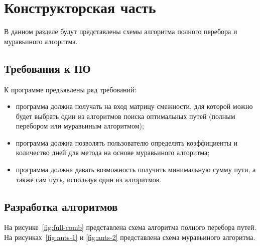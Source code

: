 \chapter{Конструкторская часть}

В данном разделе будут представлены схемы алгоритма полного перебора и муравьиного алгоритма.

\section{Требования к ПО}

К программе предъявлены ряд требований:

\begin{itemize}[label=---]
	\item программа должна получать на вход матрицу смежности, для которой можно будет выбрать один из алгоритмов поиска оптимальных путей (полным перебором или муравьиным алгоритмом);
	\item программа должна позволять пользователю определять коэффициенты и количество дней для метода на основе муравьиного алгоритма;
	\item программа должна давать возможность получить минимальную сумму пути, а также сам путь, используя один из алгоритмов.
\end{itemize}

\section{Разработка алгоритмов}

На рисунке~\ref{fig:full-comb} представлена схема алгоритма полного перебора путей.
На рисунках~\ref{fig:ants-1} и \ref{fig:ants-2}  представлена схема муравьиного алгоритма.

